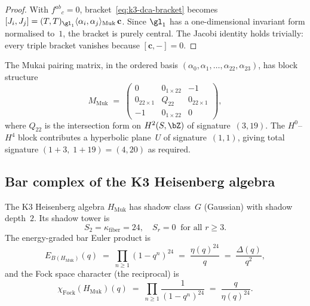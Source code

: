 \begin{proof}
With $f^{ab}{}_{c} = 0$, bracket~\eqref{eq:k3-dca-bracket} becomes
$[J_i, J_j] = (T, T)_{\gl_1} \langle \alpha_i, \alpha_j \rangle_{\mathrm{Muk}}
\, \mathbf{c}$.
Since $\gl_1$ has a one-dimensional invariant form normalised to~$1$,
the bracket is purely central.
The Jacobi identity holds trivially: every triple bracket vanishes
because $[\mathbf{c}, {-}] = 0$.
\end{proof}

The Mukai pairing matrix, in the ordered basis
$(\alpha_0, \alpha_1, \ldots, \alpha_{22}, \alpha_{23})$, has
block structure
\begin{equation}\label{eq:mukai-block-matrix}
 M_{\mathrm{Muk}} \;=\;
 \begin{pmatrix}
 0 & 0_{1 \times 22} & -1 \\
 0_{22 \times 1} & Q_{22} & 0_{22 \times 1} \\
 -1 & 0_{1 \times 22} & 0
 \end{pmatrix},
\end{equation}
where $Q_{22}$ is the intersection form on $H^2(S, \bZ)$ of
signature~$(3, 19)$.
The $H^0$--$H^4$ block contributes a hyperbolic plane~$U$ of
signature~$(1, 1)$, giving total signature
$(1 + 3,\; 1 + 19) = (4, 20)$ as required.

\subsection{Bar complex of the K3 Heisenberg algebra}
\label{subsec:k3-heisenberg-bar}

\begin{proposition}
\label{prop:k3-heisenberg-bar}
The K3 Heisenberg algebra $H_{\mathrm{Muk}}$ has shadow class~$G$
(Gaussian) with shadow depth~$2$. Its shadow tower is
\[
 S_2 = \kappa_{\mathrm{fiber}} = 24, \quad
 S_r = 0 \;\; \text{for all } r \geq 3.
\]
The energy-graded bar Euler product is
\begin{equation}\label{eq:k3-heisenberg-bar-euler}
 E_{B(H_{\mathrm{Muk}})}(q)
 \;=\;
 \prod_{n \geq 1} (1 - q^n)^{24}
 \;=\;
 \frac{\eta(q)^{24}}{q}
 \;=\;
 \frac{\Delta(q)}{q^2},
\end{equation}
and the Fock space character (the reciprocal) is
\begin{equation}\label{eq:k3-heisenberg-fock}
 \chi_{\mathrm{Fock}}(H_{\mathrm{Muk}})(q)
 \;=\;
 \prod_{n \geq 1} \frac{1}{(1 - q^n)^{24}}
 \;=\;
 \frac{q}{\eta(q)^{24}}.
\end{equation}
\end{proposition}

